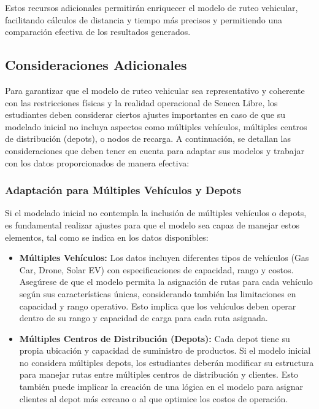 \documentclass[12pt]{article}
\begin{document}
Estos recursos adicionales permitirán enriquecer el modelo de ruteo vehicular, facilitando cálculos de distancia y tiempo más precisos y permitiendo una comparación efectiva de los resultados generados.


\subsection{Consideraciones Adicionales}

Para garantizar que el modelo de ruteo vehicular sea representativo y coherente con las restricciones físicas y la realidad operacional de Seneca Libre, los estudiantes deben considerar ciertos ajustes importantes en caso de que su modelado inicial no incluya aspectos como múltiples vehículos, múltiples centros de distribución (depots), o nodos de recarga. A continuación, se detallan las consideraciones que deben tener en cuenta para adaptar sus modelos y trabajar con los datos proporcionados de manera efectiva:

\subsubsection{Adaptación para Múltiples Vehículos y Depots}

Si el modelado inicial no contempla la inclusión de múltiples vehículos o depots, es fundamental realizar ajustes para que el modelo sea capaz de manejar estos elementos, tal como se indica en los datos disponibles:
\begin{itemize}
    \item \textbf{Múltiples Vehículos:} Los datos incluyen diferentes tipos de vehículos (Gas Car, Drone, Solar EV) con especificaciones de capacidad, rango y costos. Asegúrese de que el modelo permita la asignación de rutas para cada vehículo según sus características únicas, considerando también las limitaciones en capacidad y rango operativo. Esto implica que los vehículos deben operar dentro de su rango y capacidad de carga para cada ruta asignada.
    
    \item \textbf{Múltiples Centros de Distribución (Depots):} Cada depot tiene su propia ubicación y capacidad de suministro de productos. Si el modelo inicial no considera múltiples depots, los estudiantes deberán modificar su estructura para manejar rutas entre múltiples centros de distribución y clientes. Esto también puede implicar la creación de una lógica en el modelo para asignar clientes al depot más cercano o al que optimice los costos de operación.
\end{itemize}
\end{document}
